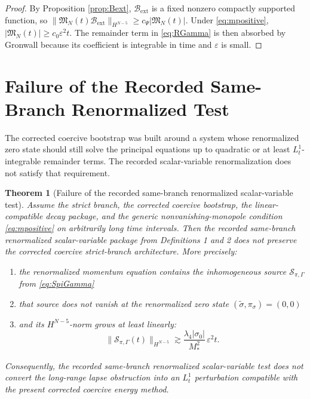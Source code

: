 \documentclass[11pt]{article}
\newtheorem{theorem}{Theorem}
\begin{document}
\begin{proof}
By Proposition \ref{prop:Bext}, \(\mathcal B_{\mathrm{ext}}\) is a fixed nonzero compactly supported function, so \(\|\mathfrak M_N(t)\mathcal B_{\mathrm{ext}}\|_{H^{N-5}} \ge c_\Psi |\mathfrak M_N(t)|\). Under \eqref{eq:mpositive}, \(|\mathfrak M_N(t)|\ge c_0\varepsilon^2 t\). The remainder term in \eqref{eq:RGamma} is then absorbed by Gronwall because its coefficient is integrable in time and \(\varepsilon\) is small.
\end{proof}

\section{Failure of the Recorded Same-Branch Renormalized Test}

The corrected coercive bootstrap was built around a system whose renormalized zero state should still solve the principal equations up to quadratic or at least \(L_t^1\)-integrable remainder terms. The recorded scalar-variable renormalization does not satisfy that requirement.

\begin{theorem}[Failure of the recorded same-branch renormalized scalar-variable test]
Assume the strict branch, the corrected coercive bootstrap, the linear-compatible decay package, and the generic nonvanishing-monopole condition \eqref{eq:mpositive} on arbitrarily long time intervals. Then the recorded same-branch renormalized scalar-variable package from Definitions 1 and 2 does \emph{not} preserve the corrected coercive strict-branch architecture. More precisely:
\begin{enumerate}
    \item the renormalized momentum equation contains the inhomogeneous source \(\mathcal S_{\pi,\Gamma}\) from \eqref{eq:SpiGamma}
    \item that source does not vanish at the renormalized zero state \((\widetilde{\sigma},\pi_\sigma)=(0,0)\)
    \item and its \(H^{N-5}\)-norm grows at least linearly:
    \begin{equation}
    \|\mathcal S_{\pi,\Gamma}(t)\|_{H^{N-5}}
    \gtrsim
    \frac{\lambda_4|\sigma_0|}{M_*^2}\,\varepsilon^2 t.
    \label{eq:linearSpi}
    \end{equation}
\end{enumerate}
Consequently, the recorded same-branch renormalized scalar-variable test does not convert the long-range lapse obstruction into an \(L_t^1\) perturbation compatible with the present corrected coercive energy method.
\label{thm:failure}
\end{theorem}
\end{document}
